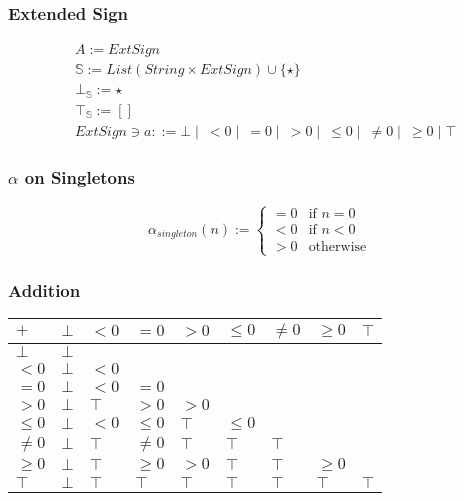 \documentclass{beamer}
\begin{document}
\begin{frame}
    \frametitle{Extended Sign}
    \begin{align*}
        &A := ExtSign\\
        &\mathbb{S} := List(String \times ExtSign) \cup \{ \star \} \\
        &\bot_\mathbb{S} := \star \\
        &\top_\mathbb{S} := [] \\
        &ExtSign \ni a ::= \bot \mid\ < 0 \mid\ = 0 \mid\ > 0 \mid\ \le 0 \mid\ \ne 0 \mid\ \ge 0 \mid \top
    \end{align*}
\end{frame}

\begin{frame}
    \frametitle{\( \alpha \) on Singletons}
    \[
        \alpha_{singleton}(n) := \begin{cases}
            =0 & \text{if } n=0\\
            <0 & \text{if } n<0\\
            >0 & \text{otherwise}
        \end{cases}    
    \]
\end{frame}


\begin{frame}
    \frametitle{Addition}
\begin{table}[]
    \begin{tabular}{|l|l|l|l|l|l|l|l|l|}
    \hline
    $+$     & $\bot$ & $<0$   & $=0$    & $>0$   & $\le 0$ & $\ne 0$ & $\ge 0$ & $\top$ \\ \hline
    $\bot$  & $\bot$ &        &         &        &         &         &         &        \\ \hline
    $<0$    & $\bot$ & $<0$   &         &        &         &         &         &        \\ \hline
    $=0$    & $\bot$ & $<0$   & $=0$    &        &         &         &         &        \\ \hline
    $>0$    & $\bot$ & $\top$ & $>0$    & $>0$   &         &         &         &        \\ \hline
    $\le 0$ & $\bot$ & $<0$   & $\le 0$ & $\top$ & $\le 0$ &         &         &        \\ \hline
    $\ne 0$ & $\bot$ & $\top$ & $\ne 0$ & $\top$ & $\top$  & $\top$  &         &        \\ \hline
    $\ge 0$ & $\bot$ & $\top$ & $\ge 0$ & $>0$   & $\top$  & $\top$  & $\ge 0$ &        \\ \hline
    $\top$  & $\bot$ & $\top$ & $\top$  & $\top$ & $\top$  & $\top$  & $\top$  & $\top$ \\ \hline
    \end{tabular}
    \end{table}
\end{frame}
    
\end{document}
